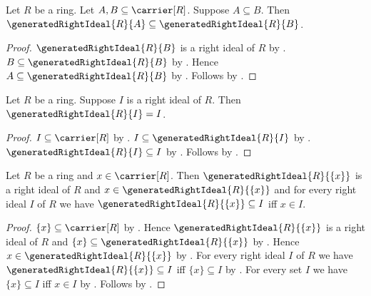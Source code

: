 \begin{proposition}\label{generated_right_ideal_monotone}
    Let $R$ be a ring.
    Let $A,B\subseteq\carrier[R]$.
    Suppose $A\subseteq B$.
    Then $\generatedRightIdeal{R}{A}\subseteq
        \generatedRightIdeal{R}{B}$.
\end{proposition}
\begin{proof}
    $\generatedRightIdeal{R}{B}$ is a right ideal of $R$ by
        .
    $B\subseteq\generatedRightIdeal{R}{B}$ by
        .
    Hence $A\subseteq\generatedRightIdeal{R}{B}$ by
        .
    Follows by .
\end{proof}

\begin{corollary}\label{generated_right_ideal_of_right_ideal}
    Let $R$ be a ring.
    Suppose $I$ is a right ideal of $R$.
    Then $\generatedRightIdeal{R}{I}=I$.
\end{corollary}
\begin{proof}
    $I\subseteq\carrier[R]$ by .
    $I\subseteq\generatedRightIdeal{R}{I}$ by
        .
    $\generatedRightIdeal{R}{I}\subseteq I$ by
        .
    Follows by .
\end{proof}

\begin{theorem}\label{principal_right_ideal_properties}
    Let $R$ be a ring and $x\in\carrier[R]$.
    Then $\generatedRightIdeal{R}{\{x\}}$ is a right ideal of $R$ and
        $x\in\generatedRightIdeal{R}{\{x\}}$ and
        for every right ideal $I$ of $R$ we have
            $\generatedRightIdeal{R}{\{x\}}\subseteq I$ iff $x\in I$.
\end{theorem}
\begin{proof}
    $\{x\}\subseteq\carrier[R]$ by .
    Hence $\generatedRightIdeal{R}{\{x\}}$ is a right ideal of $R$ and
        $\{x\}\subseteq\generatedRightIdeal{R}{\{x\}}$ by
        .
    Hence $x\in\generatedRightIdeal{R}{\{x\}}$ by
        .
    For every right ideal $I$ of $R$ we have
        $\generatedRightIdeal{R}{\{x\}}\subseteq I$ iff
        $\{x\}\subseteq I$ by
        .
    For every set $I$ we have $\{x\}\subseteq I$ iff $x\in I$ by
        .
    Follows by \auto.
\end{proof}

